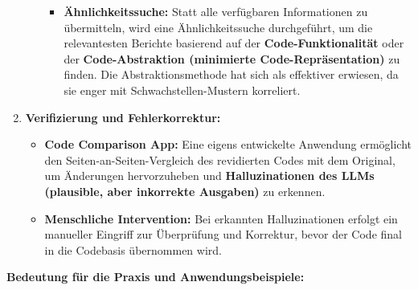 \begin{enumerate}
\begin{itemize}
\begin{itemize}
            \item \textbf{Ähnlichkeitssuche:} Statt alle verfügbaren Informationen zu übermitteln, wird eine Ähnlichkeitssuche durchgeführt, um die relevantesten Berichte basierend auf der \textbf{Code-Funktionalität} oder der \textbf{Code-Abstraktion (minimierte Code-Repräsentation)} zu finden. Die Abstraktionsmethode hat sich als effektiver erwiesen, da sie enger mit Schwachstellen-Mustern korreliert.
        \end{itemize}
    \end{itemize}

    \item \textbf{Verifizierung und Fehlerkorrektur:}
    \begin{itemize}
        \item \textbf{Code Comparison App:} Eine eigens entwickelte Anwendung ermöglicht den Seiten-an-Seiten-Vergleich des revidierten Codes mit dem Original, um Änderungen hervorzuheben und \textbf{Halluzinationen des LLMs (plausible, aber inkorrekte Ausgaben)} zu erkennen.
        \item \textbf{Menschliche Intervention:} Bei erkannten Halluzinationen erfolgt ein manueller Eingriff zur Überprüfung und Korrektur, bevor der Code final in die Codebasis übernommen wird.
    \end{itemize}
\end{enumerate}

\textbf{Bedeutung für die Praxis und Anwendungsbeispiele:}


